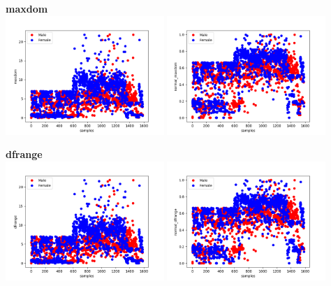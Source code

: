 \documentclass[12pt]{article}
\begin{document}
\begin{justify}
			\textbf{maxdom}\\
				\includegraphics[width=6cm]{../Graphs2/maxdom}
				\includegraphics[width=6cm]{../Graphs2/norm_maxdom}	
				
			\textbf{dfrange}\\
				\includegraphics[width=6cm]{../Graphs2/dfrange}
				\includegraphics[width=6cm]{../Graphs2/norm_dfrange}	
			

\end{justify}
\end{document}
